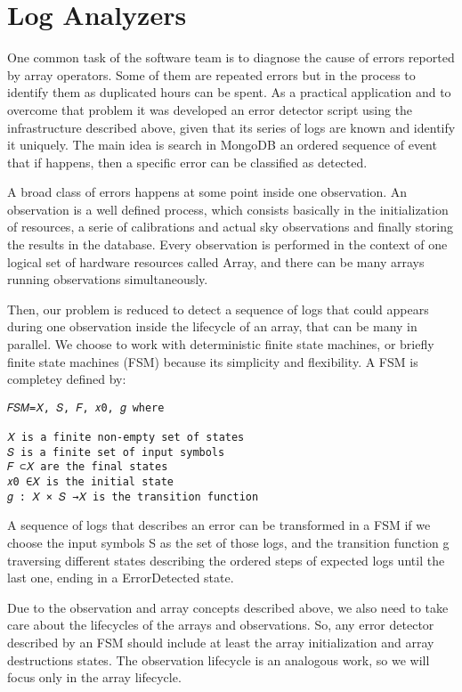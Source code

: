 \documentclass[]{spie}  %
\begin{document}
\section{Log Analyzers}
One common task of the software team is to diagnose the cause of errors
reported by array operators. Some of them are repeated errors but in the
process to identify them as duplicated hours can be spent. As a practical
application and to overcome that problem it was developed an error detector
script using the infrastructure described above, given that its series of logs
are known and identify it uniquely. The main idea is search in MongoDB an
ordered sequence of event that if happens, then a specific error can be
classified as detected.

A broad class of errors happens at some point inside one observation. An
observation is a well defined process, which consists basically in the
initialization of resources, a serie of calibrations and actual sky
observations and finally storing the results in the database. Every observation
is performed in the context of one logical set of hardware resources called
Array, and there can be many arrays running observations simultaneously. 

Then, our problem is reduced to detect a sequence of logs that could appears
during one observation inside the lifecycle of an array, that can be many in
parallel. We choose to work with deterministic finite state machines, or
briefly finite state machines (FSM) because its simplicity and flexibility. A
FSM is completey defined by:

\begin{verbatim}
𝐹𝑆𝑀=𝑋, 𝑆, 𝐹, 𝑥0, 𝑔 where

𝑋 is a finite non-empty set of states
𝑆 is a finite set of input symbols
𝐹 ⊂𝑋 are the final states
𝑥0 ∈𝑋 is the initial state
𝑔 : 𝑋 × 𝑆 →𝑋 is the transition function
\end{verbatim}

A sequence of logs that describes an error can be transformed in a FSM if we
choose the input symbols S as the set of those logs, and the transition
function g traversing different states describing the ordered steps of expected
logs until the last one, ending in a ErrorDetected state. 

Due to the observation and array concepts described above, we also need to take
care about the lifecycles of the arrays and observations. So, any error
detector described by an FSM should include at least the array initialization
and array destructions states. The observation lifecycle is an analogous work,
    so we will focus only in the array lifecycle.
\end{document}
